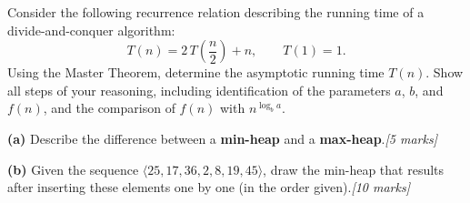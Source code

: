 \documentclass[
    language=english,
    doctype=exam,
    institution=none,
]{../../omnilatex}
\begin{document}
\begin{question}[15]
    Consider the following recurrence relation describing the running time of a
    divide-and-conquer algorithm:
    \[
        T(n) = 2\,T\!\left(\frac{n}{2}\right) + n, \qquad T(1) = 1.
    \]
    Using the Master Theorem, determine the asymptotic running time $T(n)$.
    Show all steps of your reasoning, including identification of the parameters
    $a$, $b$, and $f(n)$, and the comparison of $f(n)$ with $n^{\log_b a}$.
\end{question}
\begin{answer}[5cm]
\end{answer}

\begin{question}[15]
    \textbf{(a)} Describe the difference between a \textbf{min-heap} and a
    \textbf{max-heap}.\hfill\textit{[5 marks]}

    \textbf{(b)} Given the sequence $\langle 25, 17, 36, 2, 8, 19, 45 \rangle$,
    draw the min-heap that results after inserting these elements one by one
    (in the order given).\hfill\textit{[10 marks]}
\end{question}
\begin{answer}[5cm]
\end{answer}
\end{document}
